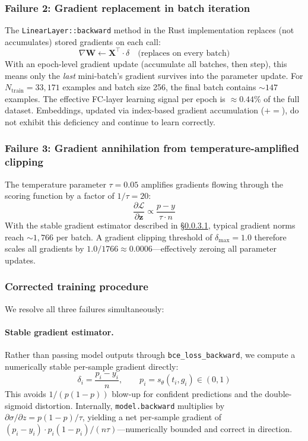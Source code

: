 \documentclass[10pt,twocolumn]{article}
\begin{document}
\subsubsection{Failure 2: Gradient replacement in batch iteration}
\label{sec:failure2}
The \texttt{LinearLayer::backward} method in the Rust implementation replaces
(not accumulates) stored gradients on each call:
\begin{equation}
    \nabla \mathbf{W} \leftarrow \mathbf{X}^\top \cdot \delta \quad
    \text{(replaces on every batch)}
\end{equation}
With an epoch-level gradient update (accumulate all batches, then step), this
means only the \emph{last} mini-batch's gradient survives into the parameter
update.
For $N_{\text{train}} = 33{,}171$ examples and batch size 256, the final batch
contains ${\sim}147$ examples.
The effective FC-layer learning signal per epoch is $\approx 0.44\%$ of the
full dataset.
Embeddings, updated via index-based gradient accumulation ($+=$), do not
exhibit this deficiency and continue to learn correctly.

\subsubsection{Failure 3: Gradient annihilation from temperature-amplified clipping}
\label{sec:failure3}
The temperature parameter $\tau = 0.05$ amplifies gradients flowing through
the scoring function by a factor of $1/\tau = 20$:
\begin{equation}
    \frac{\partial \mathcal{L}}{\partial \mathbf{z}} \propto \frac{p - y}{\tau \cdot n}
\end{equation}
With the stable gradient estimator described in \S\ref{sec:stable_grad}, typical
gradient norms reach ${\sim}1{,}766$ per batch.
A gradient clipping threshold of $\delta_{\max} = 1.0$ therefore scales all
gradients by $1.0 / 1766 \approx 0.0006$---effectively zeroing all parameter
updates.

\subsubsection{Corrected training procedure}
\label{sec:training}

We resolve all three failures simultaneously:

\paragraph{Stable gradient estimator.}
\label{sec:stable_grad}
Rather than passing model outputs through \texttt{bce\_loss\_backward},
we compute a numerically stable per-sample gradient directly:
\begin{equation}
    \delta_i = \frac{p_i - y_i}{n}, \qquad p_i = s_\theta(t_i, g_i) \in (0, 1)
    \label{eq:stable_grad}
\end{equation}
This avoids $1/(p(1{-}p))$ blow-up for confident predictions and the
double-sigmoid distortion.
Internally, \texttt{model.backward} multiplies by $\partial\sigma/\partial z =
p(1{-}p)/\tau$, yielding a net per-sample gradient of
$(p_i{-}y_i)\cdot p_i(1{-}p_i)/(n\tau)$---numerically bounded and correct in direction.
\end{document}
